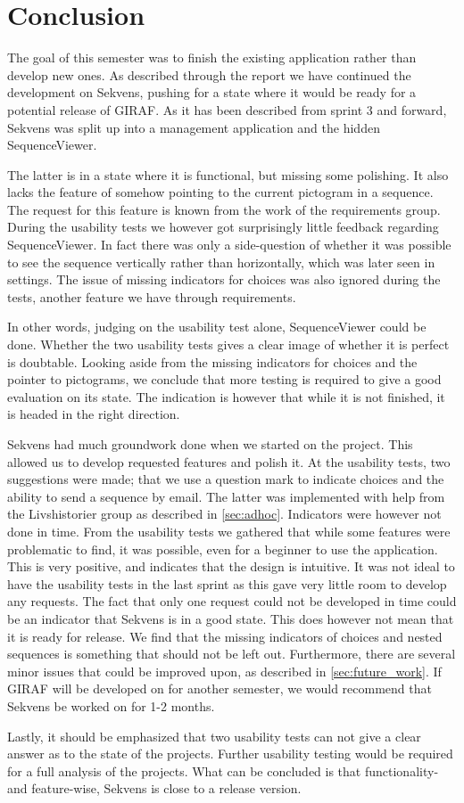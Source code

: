 \section{Conclusion}\label{sec:conclusion}
The goal of this semester was to finish the existing application rather than develop new ones. As described through the report we have continued the development on Sekvens, pushing for a state where it would be ready for a potential release of GIRAF. As it has been described from sprint 3 and forward, Sekvens was split up into a management application and the hidden SequenceViewer.

The latter is in a state where it is functional, but missing some polishing. It also lacks the feature of somehow pointing to the current pictogram in a sequence. The request for this feature is known from the work of the requirements group. During the usability tests we however got surprisingly little feedback regarding SequenceViewer. In fact there was only a side-question of whether it was possible to see the sequence vertically rather than horizontally, which was later seen in settings. The issue of missing indicators for choices was also ignored during the tests, another feature we have through requirements.

In other words, judging on the usability test alone, SequenceViewer could be done. Whether the two usability tests gives a clear image of whether it is perfect is doubtable. Looking aside from the missing indicators for choices and the pointer to pictograms, we conclude that more testing is required to give a good evaluation on its state. The indication is however that while it is not finished, it is headed in the right direction.

Sekvens had much groundwork done when we started on the project. This allowed us to develop requested features and polish it. At the usability tests, two suggestions were made; that we use a question mark to indicate choices and the ability to send a sequence by email. The latter was implemented with help from the Livshistorier group as described in \ref{sec:adhoc}. Indicators were however not done in time.
From the usability tests we gathered that while some features were problematic to find, it was possible, even for a beginner to use the application. This is very positive, and indicates that the design is intuitive.
It was not ideal to have the usability tests in the last sprint as this gave very little room to develop any requests. The fact that only one request could not be developed in time could be an indicator that Sekvens is in a good state. This does however not mean that it is ready for release. We find that the missing indicators of choices and nested sequences is something that should not be left out. Furthermore, there are several minor issues that could be improved upon, as described in \ref{sec:future_work}. If GIRAF will be developed on for another semester, we would recommend that Sekvens be worked on for 1-2 months.

Lastly, it should be emphasized that two usability tests can not give a clear answer as to the state of the projects. Further usability testing would be required for a full analysis of the projects. What can be concluded is that functionality- and feature-wise, Sekvens is close to a release version.